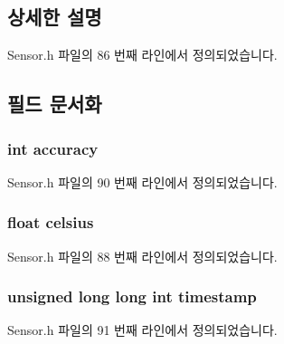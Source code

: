 \subsection{상세한 설명}


Sensor.\-h 파일의 86 번째 라인에서 정의되었습니다.



\subsection{필드 문서화}
\hypertarget{struct__Temperature__data_a5565cf9073275f9713f9016e7c10d25f}{
\subsubsection[{accuracy}]{\setlength{\rightskip}{0pt plus 5cm}int accuracy}}\label{struct__Temperature__data_a5565cf9073275f9713f9016e7c10d25f}


Sensor.\-h 파일의 90 번째 라인에서 정의되었습니다.

\hypertarget{struct__Temperature__data_aadc6619595463c1d61980fc95cad3f53}{
\subsubsection[{celsius}]{\setlength{\rightskip}{0pt plus 5cm}float celsius}}\label{struct__Temperature__data_aadc6619595463c1d61980fc95cad3f53}


Sensor.\-h 파일의 88 번째 라인에서 정의되었습니다.

\hypertarget{struct__Temperature__data_a8de02c4128636a7bf630ff5428f60c8d}{
\subsubsection[{timestamp}]{\setlength{\rightskip}{0pt plus 5cm}unsigned long long int timestamp}}\label{struct__Temperature__data_a8de02c4128636a7bf630ff5428f60c8d}


Sensor.\-h 파일의 91 번째 라인에서 정의되었습니다.

